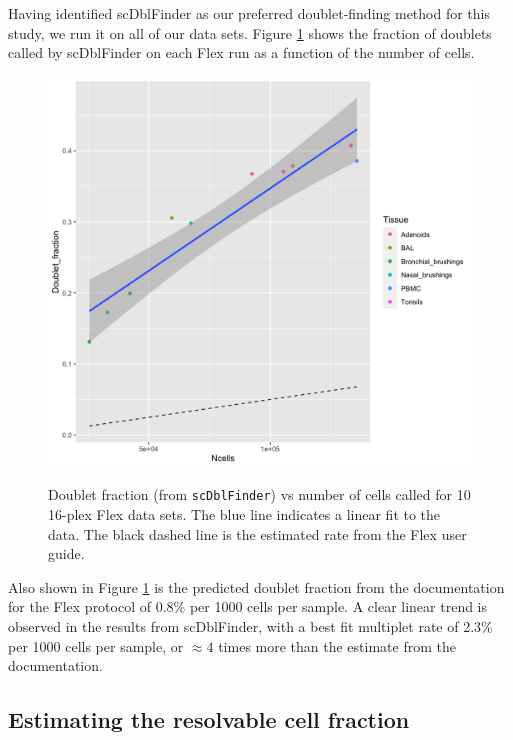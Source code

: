 \documentclass[unnumsec,webpdf,modern,large]{oup-authoring-template}
\begin{document}
	Having identified scDblFinder 
	\citep{Germain2021}
	as our preferred doublet-finding method for this study, we run it on all of our data sets. 
	Figure \ref{fig:doublet rate 16-plex} shows the fraction of doublets called by scDblFinder on each Flex run as a function of the number of cells.
	\begin{figure}
		\begin{center}
			\includegraphics[scale=0.2]{figures/doublet_rate_16plex.png}	\\
			\caption{Doublet fraction (from \texttt{scDblFinder}) vs number of cells called for 10 16-plex Flex data sets. 
				The blue line indicates a linear fit to the data. 
				The black dashed line is the estimated rate from the Flex user guide. 
			}		
			\label{fig:doublet rate 16-plex}
		\end{center}
	\end{figure}
	Also shown in Figure  \ref{fig:doublet rate 16-plex} is the predicted doublet fraction from the documentation for the Flex protocol 
	\citep{10X_flex_protocol}
	of 0.8\% per 1000 cells per sample. 
	A clear linear trend is observed in the results from scDblFinder, with a best fit multiplet rate of 2.3\% per 1000 cells per sample, or $\approx 4$ times more than the estimate from the documentation.
		
	\subsection{Estimating the resolvable cell fraction}
	\label{subsec:multiplet theory}
	
\end{document}
